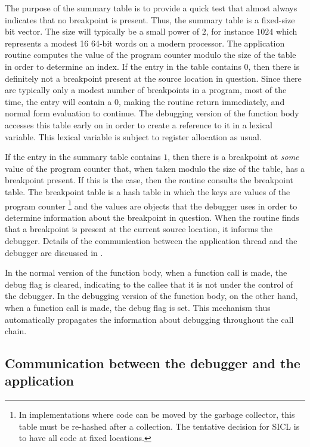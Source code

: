 The purpose of the summary table is to provide a quick test that
almost always indicates that no breakpoint is present.  Thus, the
summary table is a fixed-size bit vector.  The size will typically be
a small power of $2$, for instance $1024$ which represents a modest 16
64-bit words on a modern processor.  The application routine computes
the value of the program counter modulo the size of the table in order
to determine an index.  If the entry in the table contains $0$, then
there is definitely not a breakpoint present at the source location in
question.  Since there are typically only a modest number of
breakpoints in a program, most of the time, the entry will contain a
$0$, making the routine return immediately, and normal form evaluation
to continue.  The debugging version of the function body accesses this
table early on in order to create a reference to it in a lexical
variable.  This lexical variable is subject to register allocation as
usual.

If the entry in the summary table contains $1$, then there is a
breakpoint at \emph{some} value of the program counter that, when
taken modulo the size of the table, has a breakpoint present.  If this
is the case, then the routine consults the breakpoint table.
The breakpoint table is a hash table in which the keys are values of
the program counter%
\footnote{In implementations where code can be moved by the garbage
  collector, this table must be re-hashed after a collection.  The
  tentative decision for SICL is to have all code at fixed locations.}
and the values are objects that the debugger uses in order to
determine information about the breakpoint in question.  When the
routine finds that a breakpoint is present at the current source
location, it informs the debugger.  Details of the communication
between the application thread and the debugger are discussed in
.

In the normal version of the function body, when a function call is
made, the debug flag is cleared, indicating to the callee that it is
not under the control of the debugger.  In the debugging version of
the function body, on the other hand, when a function call is
made, the debug flag is set.  This mechanism thus automatically
propagates the information about debugging throughout the call chain.

\subsection{Communication between the debugger and the application}
\label{sec-debugger-application-communication}

